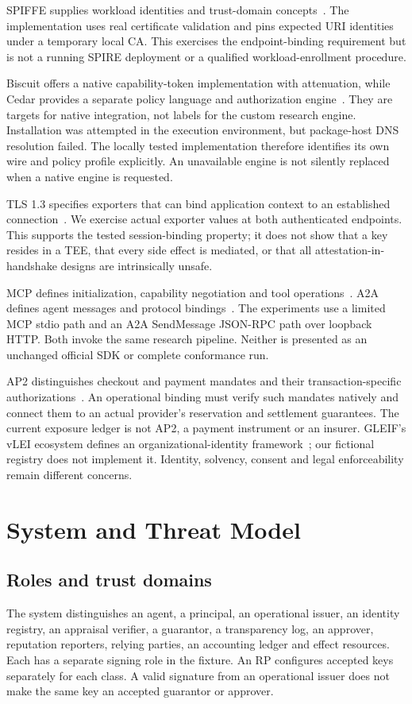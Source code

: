 \documentclass[journal,10pt]{IEEEtran}
\begin{document}
SPIFFE supplies workload identities and trust-domain concepts~\cite{spiffe}. The implementation uses real certificate validation and pins expected URI identities under a temporary local CA. This exercises the endpoint-binding requirement but is not a running SPIRE deployment or a qualified workload-enrollment procedure.

Biscuit offers a native capability-token implementation with attenuation, while Cedar provides a separate policy language and authorization engine~\cite{biscuit,cedar}. They are targets for native integration, not labels for the custom research engine. Installation was attempted in the execution environment, but package-host DNS resolution failed. The locally tested implementation therefore identifies its own wire and policy profile explicitly. An unavailable engine is not silently replaced when a native engine is requested.

TLS 1.3 specifies exporters that can bind application context to an established connection~\cite{tls}. We exercise actual exporter values at both authenticated endpoints. This supports the tested session-binding property; it does not show that a key resides in a TEE, that every side effect is mediated, or that all attestation-in-handshake designs are intrinsically unsafe.

MCP defines initialization, capability negotiation and tool operations~\cite{mcp-life,mcp-tools}. A2A defines agent messages and protocol bindings~\cite{a2a}. The experiments use a limited MCP stdio path and an A2A SendMessage JSON-RPC path over loopback HTTP. Both invoke the same research pipeline. Neither is presented as an unchanged official SDK or complete conformance run.

AP2 distinguishes checkout and payment mandates and their transaction-specific authorizations~\cite{ap2}. An operational binding must verify such mandates natively and connect them to an actual provider's reservation and settlement guarantees. The current exposure ledger is not AP2, a payment instrument or an insurer. GLEIF's vLEI ecosystem defines an organizational-identity framework~\cite{vlei}; our fictional registry does not implement it. Identity, solvency, consent and legal enforceability remain different concerns.

\section{System and Threat Model}
\subsection{Roles and trust domains}
The system distinguishes an agent, a principal, an operational issuer, an identity registry, an appraisal verifier, a guarantor, a transparency log, an approver, reputation reporters, relying parties, an accounting ledger and effect resources. Each has a separate signing role in the fixture. An RP configures accepted keys separately for each class. A valid signature from an operational issuer does not make the same key an accepted guarantor or approver.
\end{document}
